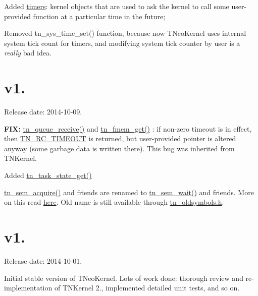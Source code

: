 \begin{DoxyItemize}
\item Added \hyperlink{tn__timer_8h}{timers}\+: kernel objects that are used to ask the kernel to call some user-\/provided function at a particular time in the future;
\item Removed {\ttfamily tn\+\_\+sys\+\_\+time\+\_\+set()} function, because now T\+Neo\+Kernel uses internal system tick count for timers, and modifying system tick counter by user is a {\itshape really} bad idea.
\end{DoxyItemize}\hypertarget{changelog_changelog_v1_01}{}\section{v1.}\label{changelog_changelog_v1_01}
Release date\+: 2014-\/10-\/09.


\begin{DoxyItemize}
\item {\bfseries F\+I\+X\+:} {\ttfamily \hyperlink{tn__dqueue_8h_a589bfb4d3966bc7405dcf959d7114544}{tn\+\_\+queue\+\_\+receive()}} and {\ttfamily \hyperlink{tn__fmem_8h_afb45a1f427b531b22f1f4b013f415ae0}{tn\+\_\+fmem\+\_\+get()}} \+: if non-\/zero {\ttfamily timeout} is in effect, then {\ttfamily \hyperlink{tn__common_8h_aa43bd3da1ad4c1e61224b5f23b369876a5b4d73fde6b5d1c9579c02e6aafce1fb}{T\+N\+\_\+\+R\+C\+\_\+\+T\+I\+M\+E\+O\+U\+T}} is returned, but user-\/provided pointer is altered anyway (some garbage data is written there). This bug was inherited from T\+N\+Kernel.
\item Added {\ttfamily \hyperlink{tn__tasks_8h_a18408d825c0dab03511f3aaeeb3ffbb3}{tn\+\_\+task\+\_\+state\+\_\+get()}}
\item {\ttfamily \hyperlink{tn__oldsymbols_8h_abdc5c428590ff525cdb566da613015ce}{tn\+\_\+sem\+\_\+acquire()}} and friends are renamed to {\ttfamily \hyperlink{tn__sem_8h_a6bf88a78f4f8b2799f72ee671b52ed97}{tn\+\_\+sem\+\_\+wait()}} and friends. More on this read \hyperlink{tnkernel_diff_tnkernel_diff_api_rename_sem}{here}. Old name is still available through {\ttfamily \hyperlink{tn__oldsymbols_8h}{tn\+\_\+oldsymbols.\+h}}.
\end{DoxyItemize}\hypertarget{changelog_changelog_v1_0}{}\section{v1.}\label{changelog_changelog_v1_0}
Release date\+: 2014-\/10-\/01.


\begin{DoxyItemize}
\item Initial stable version of T\+Neo\+Kernel. Lots of work done\+: thorough review and re-\/implementation of T\+N\+Kernel 2., implemented detailed unit tests, and so on. 
\end{DoxyItemize}